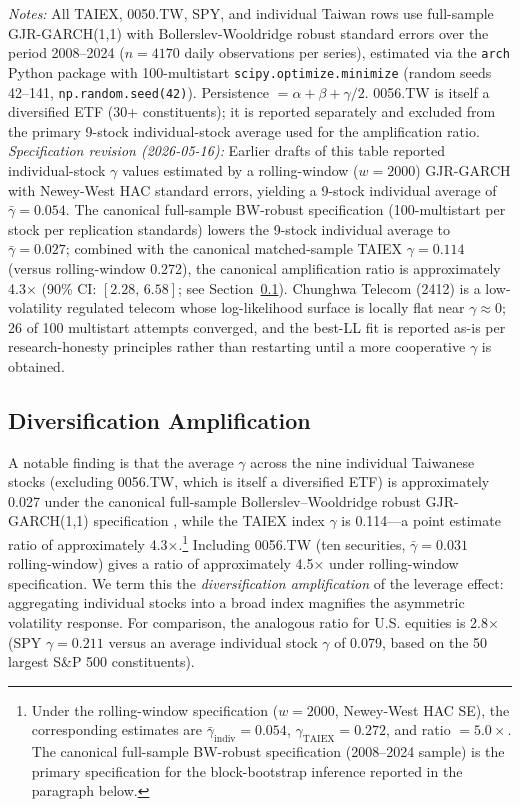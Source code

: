 \begin{table}[H]
\begin{flushleft}
\small \textit{Notes:} All TAIEX, 0050.TW, SPY, and individual Taiwan rows use full-sample GJR-GARCH(1,1) with Bollerslev-Wooldridge robust standard errors over the period 2008--2024 ($n=4170$ daily observations per series), estimated via the \texttt{arch} Python package with 100-multistart \texttt{scipy.optimize.minimize} (random seeds 42--141, \texttt{np.random.seed(42)}). Persistence $= \alpha + \beta + \gamma/2$. 0056.TW is itself a diversified ETF (30+ constituents); it is reported separately and excluded from the primary 9-stock individual-stock average used for the amplification ratio. \textit{Specification revision (2026-05-16):} Earlier drafts of this table reported individual-stock $\gamma$ values estimated by a rolling-window ($w=2000$) GJR-GARCH with Newey-West HAC standard errors, yielding a 9-stock individual average of $\bar{\gamma}=0.054$. The canonical full-sample BW-robust specification (100-multistart per stock per \citealp{harvey2016} replication standards) lowers the 9-stock individual average to $\bar{\gamma}=0.027$; combined with the canonical matched-sample TAIEX $\gamma=0.114$ (versus rolling-window 0.272), the canonical amplification ratio is approximately 4.3$\times$ (90\% CI: $[2.28, \, 6.58]$; see Section~\ref{sec:diversification}). Chunghwa Telecom (2412) is a low-volatility regulated telecom whose log-likelihood surface is locally flat near $\gamma\approx 0$; 26 of 100 multistart attempts converged, and the best-LL fit is reported as-is per research-honesty principles rather than restarting until a more cooperative $\gamma$ is obtained.
\end{flushleft}
\end{table}

\subsection{Diversification Amplification}\label{sec:diversification}

A notable finding is that the average $\gamma$ across the nine individual Taiwanese stocks (excluding 0056.TW, which is itself a diversified ETF) is approximately 0.027 under the canonical full-sample Bollerslev--Wooldridge robust GJR-GARCH(1,1) specification \citep{bollerslev1992}, while the TAIEX index $\gamma$ is 0.114---a point estimate ratio of approximately 4.3$\times$.\footnote{Under the rolling-window specification ($w=2000$, Newey-West HAC SE), the corresponding estimates are $\bar{\gamma}_{\text{indiv}}=0.054$, $\gamma_{\text{TAIEX}}=0.272$, and ratio $=5.0\times$. The canonical full-sample BW-robust specification (2008--2024 sample) is the primary specification for the block-bootstrap inference reported in the paragraph below.} Including 0056.TW (ten securities, $\bar{\gamma} = 0.031$ rolling-window) gives a ratio of approximately 4.5$\times$ under rolling-window specification. We term this the \textit{diversification amplification} of the leverage effect: aggregating individual stocks into a broad index magnifies the asymmetric volatility response. For comparison, the analogous ratio for U.S. equities is 2.8$\times$ (SPY $\gamma = 0.211$ versus an average individual stock $\gamma$ of 0.079, based on the 50 largest S\&P 500 constituents).

